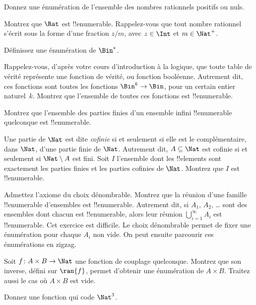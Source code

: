 \documentclass[../../../include/open-logic-section]{subfiles}
\begin{document}
\begin{prob}
Donnez une énumération de l’ensemble des nombres rationnels
positifs ou nuls.
\end{prob}

\begin{prob}
Montrez que $\Rat$ est !!{enumerable}. Rappelez-vous que tout
nombre rationnel s’écrit sous la forme d’une fraction $z/m$,
avec $z \in \Int$ et $m \in \Nat^+$.
\end{prob}

\begin{prob}
Définissez une énumération de $\Bin^*$.
\end{prob}

\begin{prob}
Rappelez-vous, d’après votre cours d’introduction à la logique,
que toute table de vérité représente une fonction de vérité,
ou fonction booléenne. Autrement dit, ces fonctions sont toutes
les fonctions $\Bin^k \to \Bin$, pour un certain entier
naturel~$k$. Montrez que l’ensemble de toutes ces fonctions
est !!{enumerable}.
\end{prob}

\begin{prob}
Montrez que l’ensemble des parties finies d’un ensemble infini
!!{enumerable} quelconque est !!{enumerable}.
\end{prob}

\begin{prob}
Une partie de $\Nat$ est dite \emph{cofinie} si et seulement si
elle est le complémentaire, dans $\Nat$, d’une partie finie de $\Nat$.
Autrement dit, $A \subseteq \Nat$ est cofinie si et seulement si
$\Nat\setminus A$ est fini. Soit $I$ l’ensemble dont les
!!{element}s sont exactement les parties finies et les parties
cofinies de $\Nat$. Montrez que $I$ est !!{enumerable}.
\end{prob}

\begin{prob}
Admettez l’axiome du choix dénombrable. Montrez que la réunion
d’une famille !!{enumerable} d’ensembles 
est !!{enumerable}. Autrement dit, si $A_1$, $A_2$, \dots{} sont des
ensembles dont chacun est !!{enumerable}, alors leur réunion
$\bigcup_{i=1}^\infty A_i$ est !!{enumerable}.
Cet exercice est difficile. Le choix dénombrable permet de fixer
une énumération pour chaque $A_i$ non vide. On peut ensuite
parcourir ces énumérations en zigzag.
%
%
\end{prob}

\begin{prob}
Soit $f \colon A \times B \to \Nat$ une fonction de couplage
quelconque. Montrez que son inverse, défini sur $\ran{f}$,
permet d’obtenir une énumération de $A \times B$.
Traitez aussi le cas où $A \times B$ est vide.
%
%
%
%
%
\end{prob}

\begin{prob}
Donnez une fonction qui code $\Nat^3$.
\end{prob}
\end{document}

